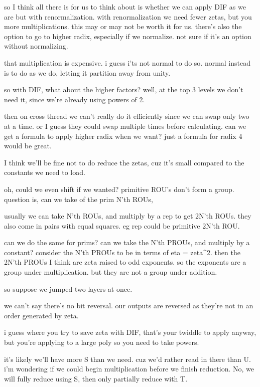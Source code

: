 so I think all there is for us to think about is whether we can apply DIF as we are but with renormalization. 
with renormalization we need fewer zetas, but you more multiplications.
this may or may not be worth it for us.
there's also the option to go to higher radix, especially if we normalize.
not sure if it's an option without normalizing.

that multiplication is expensive. i guess i'ts not normal to do so. 
normal instead is to do as we do, letting it partition away from unity.

so with DIF, what about the higher factors?
well, at the top 3 levels we don't need it, since we're already using powers of 2. 

then on cross thread we can't really do it efficiently since we can swap only two at a time.
or I guess they could swap multiple times before calculating.
can we get a formula to apply higher radix when we want?
just a formula for radix 4 would be great.


I think we'll be fine not to do reduce the zetas, cuz it's small compared to the constants we need to load. 

oh, could we even shift if we wanted? 
primitive ROU's don't form a group.
question is, can we take of the prim N'th ROUs, 

usually we can take N'th ROUs, and multiply by a rep to get 2N'th ROUs.
they also come in pairs with equal squares. 
eg rep could be primitive 2N'th ROU.

can we do the same for prims?
can we take the N'th PROUs, and multiply by a constant? 
consider the N'th PROUs to be in terms of eta = zeta^2.
then the 2N'th PROUs I think are zeta raised to odd exponents. so 
the exponents are a group under multiplication. but they are not a group under addition.

so suppose we jumped two layers at once.



we can't say there's no bit reversal. our outputs are reversed as they're not in an order generated by zeta.


i guess where you try to save zeta with DIF,
that's your twiddle to apply anyway, but you're applying to a large poly so you need to take powers. 


it's likely we'll have more S than we need. cuz we'd rather read in there than U.
i'm wondering if we could begin multiplication before we finish reduction.
No, we will fully reduce using S, then only partially reduce with T. 

